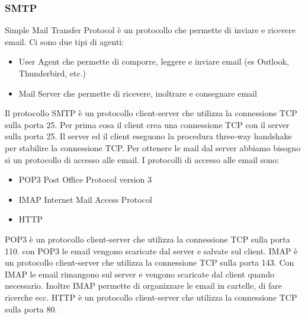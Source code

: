 \documentclass[12pt]{article}
\begin{document}
\subsubsection{SMTP}
Simple Mail Transfer Protocol è un protocollo che permette di inviare e ricevere email.
Ci sono due tipi di agenti:
\begin{itemize}
    \item User Agent che permette di comporre, leggere e inviare email (es Outlook, Thunderbird, etc.)
    \item Mail Server che permette di ricevere, inoltrare e consegnare email
\end{itemize}
Il protocollo SMTP è un protocollo client-server che utilizza la connessione TCP sulla porta 25.
Per prima cosa il client crea una connessione TCP con il server sulla porta 25.
Il server ed il client eseguono la procedura three-way handshake per stabilire la connessione TCP.
Per ottenere le mail dal server abbiamo bisogno si un protocollo di accesso alle email.
I protocolli di accesso alle email sono:
\begin{itemize}
    \item POP3 Post Office Protocol version 3
    \item IMAP Internet Mail Access Protocol
    \item HTTP
\end{itemize}
POP3 è un protocollo client-server che utilizza la connessione TCP sulla porta 110.
con POP3 le email vengono scaricate dal server e salvate sul client.
IMAP è un protocollo client-server che utilizza la connessione TCP sulla porta 143.
Con IMAP le email rimangono sul server e vengono scaricate dal client quando necessario.
Inoltre IMAP permette di organizzare le email in cartelle, di fare ricerche ecc.
HTTP è un protocollo client-server che utilizza la connessione TCP sulla porta 80.
\end{document}
